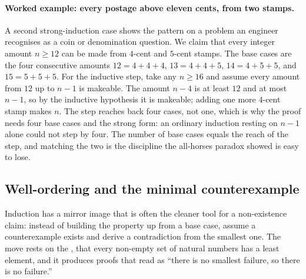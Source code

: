 \paragraph{Worked example: every postage above eleven cents, from two
stamps.} A second strong-induction case shows the pattern on a problem
an engineer recognises as a coin or denomination question. We claim that
every integer amount $n \geq 12$ can be made from $4$-cent and $5$-cent
stamps. The base cases are the four consecutive amounts $12 = 4 + 4 + 4$,
$13 = 4 + 4 + 5$, $14 = 4 + 5 + 5$, and $15 = 5 + 5 + 5$. For the
inductive step, take any $n \geq 16$ and assume every amount from $12$ up
to $n - 1$ is makeable. The amount $n - 4$ is at least $12$ and at most
$n - 1$, so by the inductive hypothesis it is makeable; adding one more
$4$-cent stamp makes $n$. The step reaches back four cases, not one,
which is why the proof needs four base cases and the strong form: an
ordinary induction resting on $n - 1$ alone could not step by four. The
number of base cases equals the reach of the step, and matching the two
is the discipline the all-horses paradox showed is easy to lose.

\subsection{Well-ordering and the minimal counterexample}

Induction has a mirror image that is often the cleaner tool for a
non-existence claim: instead of building the property up from a base
case, assume a counterexample exists and derive a contradiction from the
smallest one. The move rests on the ,
that every non-empty set of natural numbers has a least element, and it
produces proofs that read as ``there is no smallest failure, so there is
no failure.''

